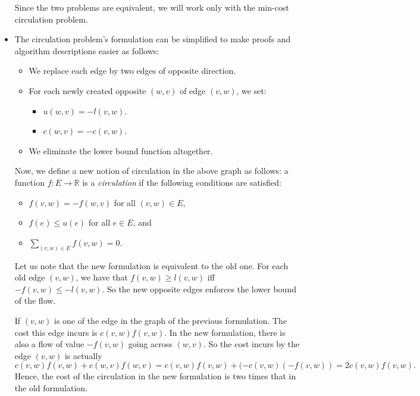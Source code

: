 \documentclass[10pt]{article}
\begin{document}
\begin{itemize}
        Since the two problems are equivalent, we will work only with
        the min-cost circulation problem.
        
      \item The circulation problem's formulation can be simplified to
        make proofs and algorithm descriptions easier as follows:
        \begin{itemize}
          \item We replace each edge by two edges of opposite direction.
          \item For each newly created opposite $(w,v)$ of edge $(v,w)$,
            we set:
            \begin{itemize}
              \item $u(w,v) = -l(v,w)$.
              \item $c(w,v) = -c(v,w)$.
            \end{itemize}
          \item We eliminate the lower bound function altogether.
        \end{itemize}
        
        Now, we define a new notion of circulation in the above graph
        as follows: a function $f: E \rightarrow \mathbb{R}$ is a
        \emph{circulation} if the following conditions are satisfied:
        \begin{itemize}
          \item $f(v,w) = -f(w,v)$ for all $(v,w) \in E$,
          \item $f(e) \leq u(e)$ for all $e \in E$, and
          \item $\sum_{(v,w) \in E} f(v,w) = 0$.
        \end{itemize}
        
        Let us note that the new formulation is equivalent to the old
        one. For each old edge $(v,w)$, we have that $f(v,w) \geq l(v,w)$
        iff $-f(v,w) \leq -l(v,w)$. So the new opposite edges enforces
        the lower bound of the flow. 
        
        If $(v,w)$ is one of the edge in the graph of the previous
        formulation. The cost this edge incurs is $c(v,w)f(v,w)$.
        In the new formulation, there is also a flow of value $-f(v,w)$ 
        going across $(w,v)$. So the cost incurs by the edge $(v,w)$
        is actually $$c(v,w)f(v,w) + c(w,v)f(w,v)
        = c(v,w)f(v,w) + (-c(v,w)(-f(v,w)) = 2c(v,w)f(v,w).$$
        Hence, the cost of the circulation in the new formulation
        is two times that in the old formulation.


\end{itemize}
\end{document}
